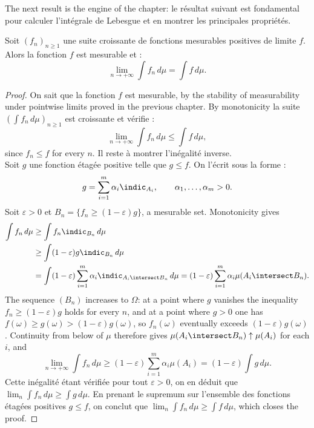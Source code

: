 The next result is the engine of the chapter: le résultat suivant est fondamental
pour calculer l'intégrale de Lebesgue et en montrer les principales propriétés.

\begin{lemma}
  Soit $(f_{n})_{n \geq 1}$ une suite croissante de fonctions mesurables positives
  de limite $f$. Alors la fonction $f$ est mesurable et :
  \[
    \lim_{n \to +\infty} \int f_{n} \, d\mu = \int f \, d\mu .
  \]
\end{lemma}

\begin{proof}
  On sait que la fonction $f$ est mesurable, by the stability of measurability under
  pointwise limits proved in the previous chapter. By monotonicity la suite $\left(
  \int f_{n} \, d\mu \right)_{n \geq 1}$ est croissante et vérifie :
  \[
    \lim_{n \to +\infty} \int f_{n} \, d\mu \leq \int f \, d\mu ,
  \]
  since $f_{n} \leq f$ for every $n$. Il reste à montrer l'inégalité inverse.\\

  Soit $g$ une fonction étagée positive telle que $g \leq f$. On l'écrit sous la
  forme :
  \[
    g = \sum_{i=1}^{m} \alpha_{i} \indic_{A_{i}},
    \qquad \alpha_{1},\ldots,\alpha_{m} > 0 .
  \]
  Soit $\varepsilon > 0$ et $B_{n} = \{f_{n} \geq (1-\varepsilon) g\}$, a mesurable
  set. Monotonicity gives
  \begin{align*}
    \int f_{n} \, d\mu
      &\geq \int f_{n} \indic_{B_{n}} \, d\mu \\
      &\geq \int (1-\varepsilon) g \indic_{B_{n}} \, d\mu \\
      &= \int (1-\varepsilon) \sum_{i=1}^{m} \alpha_{i}
         \indic_{A_{i} \intersect B_{n}} \, d\mu
       = (1-\varepsilon) \sum_{i=1}^{m} \alpha_{i}
         \mu(A_{i} \intersect B_{n}) .
  \end{align*}
  The sequence $(B_{n})$ increases to $\Omega$: at a point where $g$ vanishes the
  inequality $f_{n} \geq (1-\varepsilon) g$ holds for every $n$, and at a point where
  $g > 0$ one has $f(\omega) \geq g(\omega) > (1-\varepsilon) g(\omega)$, so
  $f_{n}(\omega)$ eventually exceeds $(1-\varepsilon) g(\omega)$. Continuity from
  below of $\mu$ therefore gives $\mu(A_{i} \intersect B_{n}) \uparrow \mu(A_{i})$
  for each $i$, and
  \[
    \lim_{n \to +\infty} \int f_{n} \, d\mu
    \geq (1-\varepsilon) \sum_{i=1}^{m} \alpha_{i} \mu(A_{i})
    = (1-\varepsilon) \int g \, d\mu .
  \]
  Cette inégalité étant vérifiée pour tout $\varepsilon > 0$, on en déduit que
  $\lim_{n} \int f_{n} \, d\mu \geq \int g \, d\mu$. En prenant le supremum sur
  l'ensemble des fonctions étagées positives $g \leq f$, on conclut que $\lim_{n}
  \int f_{n} \, d\mu \geq \int f \, d\mu$, which closes the proof.
\end{proof}

